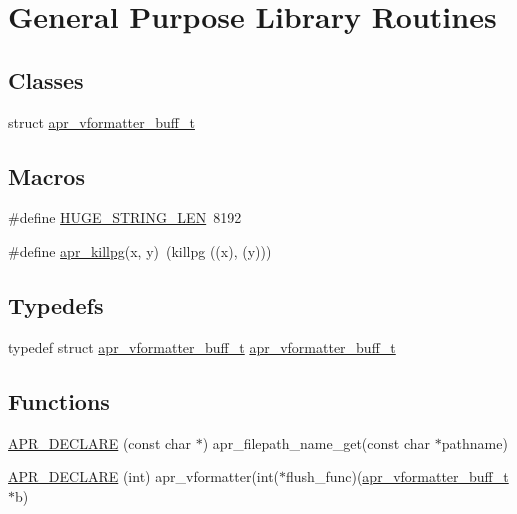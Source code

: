 \hypertarget{group__apr__lib}{}\section{General Purpose Library Routines}
\label{group__apr__lib}
\subsection*{Classes}
\begin{DoxyCompactItemize}
\item 
struct \mbox{\hyperlink{structapr__vformatter__buff__t}{apr\+\_\+vformatter\+\_\+buff\+\_\+t}}
\end{DoxyCompactItemize}
\subsection*{Macros}
\begin{DoxyCompactItemize}
\item 
\#define \mbox{\hyperlink{group__apr__lib_ga0c9dd98f46b90b5bcd4cbf75e252d0da}{H\+U\+G\+E\+\_\+\+S\+T\+R\+I\+N\+G\+\_\+\+L\+EN}}~8192
\item 
\#define \mbox{\hyperlink{group__apr__lib_gaa3b0264aadbd9f8d805252fb1ca1cd0e}{apr\+\_\+killpg}}(x,  y)~(killpg ((x), (y)))
\end{DoxyCompactItemize}
\subsection*{Typedefs}
\begin{DoxyCompactItemize}
\item 
typedef struct \mbox{\hyperlink{structapr__vformatter__buff__t}{apr\+\_\+vformatter\+\_\+buff\+\_\+t}} \mbox{\hyperlink{group__apr__lib_ga5e9986deebda40f2d1cf8364fa03c3c5}{apr\+\_\+vformatter\+\_\+buff\+\_\+t}}
\end{DoxyCompactItemize}
\subsection*{Functions}
\begin{DoxyCompactItemize}
\item 
\mbox{\hyperlink{group__apr__lib_gafc328be562cbf80885289214b616e86f}{A\+P\+R\+\_\+\+D\+E\+C\+L\+A\+RE}} (const char $\ast$) apr\+\_\+filepath\+\_\+name\+\_\+get(const char $\ast$pathname)
\item 
\mbox{\hyperlink{group__apr__lib_gabfb3aa49508166a7d0cc70945b0164b7}{A\+P\+R\+\_\+\+D\+E\+C\+L\+A\+RE}} (int) apr\+\_\+vformatter(int($\ast$flush\+\_\+func)(\mbox{\hyperlink{structapr__vformatter__buff__t}{apr\+\_\+vformatter\+\_\+buff\+\_\+t}} $\ast$b)
\end{DoxyCompactItemize}
